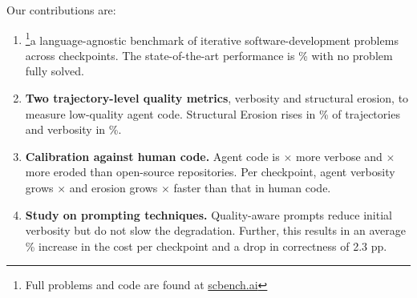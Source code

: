 Our contributions are:
\begin{enumerate}
    \item \textbf{\scb{}} \footnote{Full problems and code are found at \href{https://www.scbench.ai}{scbench.ai}}a language-agnostic benchmark of \transProblems{} iterative software-development problems across \overallTotalCheckpoints{} checkpoints. The state-of-the-art performance is \overallBestStrictSolveRate{}\% with no problem fully solved.
    \item \textbf{Two trajectory-level quality metrics}, verbosity and structural erosion, to measure low-quality agent code. Structural Erosion rises in \erosionPctIncreasing{}\% of trajectories and verbosity in \vfTrajIncPct{}\%.
    \item \textbf{Calibration against human code.} Agent code is \avhAllVerbRatio{}$\times$ more verbose and \avhAllErosionRatio{}$\times$ more eroded than \avhPanelN{} open-source repositories. Per checkpoint, agent verbosity grows \avhAgentVerbSlopeRatio{}$\times$ and erosion grows \avhAgentErosSlopeRatio{}$\times$ faster than that in human code.
    \item \textbf{Study on prompting techniques.} Quality-aware prompts reduce initial verbosity but do not slow the degradation. Further, this results in an average \psRqCostIncreaseMean\% increase in the cost per checkpoint and a drop in correctness of 2.3 pp.
\end{enumerate}
